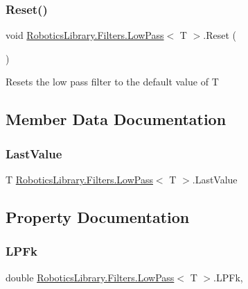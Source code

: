 \subsubsection{\texorpdfstring{Reset()}{Reset()}}
{\footnotesize\ttfamily void \hyperlink{class_robotics_library_1_1_filters_1_1_low_pass}{Robotics\+Library.\+Filters.\+Low\+Pass}$<$ T $>$.Reset (\begin{DoxyParamCaption}{ }\end{DoxyParamCaption})}



Resets the low pass filter to the default value of {\ttfamily T} 



\subsection{Member Data Documentation}
\mbox{\label{class_robotics_library_1_1_filters_1_1_low_pass_a0d00e590f0cdafdd06200870121e9b07}} 
\subsubsection{\texorpdfstring{Last\+Value}{LastValue}}
{\footnotesize\ttfamily T \hyperlink{class_robotics_library_1_1_filters_1_1_low_pass}{Robotics\+Library.\+Filters.\+Low\+Pass}$<$ T $>$.Last\+Value\hspace{0.3cm}{\ttfamily [private]}}



\subsection{Property Documentation}
\mbox{\label{class_robotics_library_1_1_filters_1_1_low_pass_aa10538fde21bb3d7a4c5640b615c4013}} 
\subsubsection{\texorpdfstring{L\+P\+Fk}{LPFk}}
{\footnotesize\ttfamily double \hyperlink{class_robotics_library_1_1_filters_1_1_low_pass}{Robotics\+Library.\+Filters.\+Low\+Pass}$<$ T $>$.L\+P\+Fk\hspace{0.3cm}{\ttfamily [get]}, {}}

